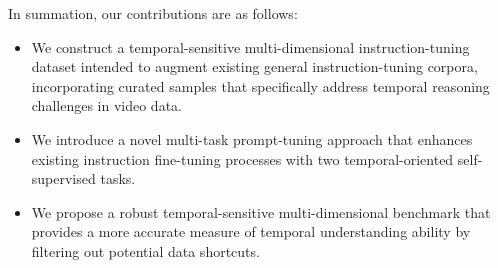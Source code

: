    
In summation, our contributions are as follows:
\begin{itemize}
    \item We construct a temporal-sensitive  multi-dimensional instruction-tuning dataset intended to augment existing general instruction-tuning corpora, incorporating curated samples that specifically address temporal reasoning challenges in video data.
    
    \item We introduce a novel multi-task prompt-tuning approach that enhances existing instruction fine-tuning processes with two temporal-oriented self-supervised tasks. 

    \item We propose a robust temporal-sensitive  multi-dimensional benchmark that provides a more accurate measure of temporal understanding ability by filtering out potential data shortcuts.

\end{itemize}



